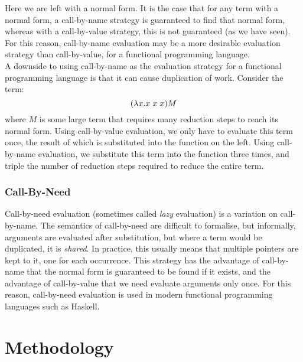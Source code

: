 \documentclass{article}
\begin{document}
Here we are left with a normal form. It is the case that for any term with a normal form, a call-by-name strategy is guaranteed to find that normal form, whereas with a call-by-value strategy, this is not guaranteed (as we have seen). For this reason, call-by-name evaluation may be a more desirable evaluation strategy than call-by-value, for a functional programming language.
\\\indent A downside to using call-by-name as the evaluation strategy for a functional programming language is that it can cause duplication of work. Consider the term:
\[ (\lambda x.x \hspace{1mm} x \hspace{1mm} x)M \]
where $M$ is some large term that requires many reduction steps to reach its normal form. Using call-by-value evaluation, we only have to evaluate this term once, the result of which is substituted into the function on the left. Using call-by-name evaluation, we substitute this term into the function three times, and triple the number of reduction steps required to reduce the entire term.
\subsubsection{Call-By-Need}
Call-by-need evaluation (sometimes called \emph{lazy} evaluation) is a variation on call-by-name. The semantics of call-by-need are difficult to formalise, but informally, arguments are evaluated after substitution, but where a term would be duplicated, it is \emph{shared}. In practice, this usually means that multiple pointers are kept to it, one for each occurrence. This strategy has the advantage of call-by-name that the normal form is guaranteed to be found if it exists, and the advantage of call-by-value that we need evaluate arguments only once. For this reason, call-by-need evaluation is used in modern functional programming languages such as Haskell.

\pagebreak
\section{Methodology}
\end{document}
